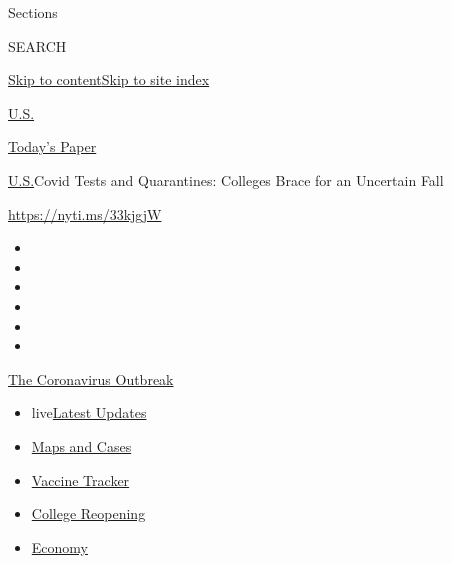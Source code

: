 Sections

SEARCH

\protect\hyperlink{site-content}{Skip to
content}\protect\hyperlink{site-index}{Skip to site index}

\href{https://www.nytimes.com/section/us}{U.S.}

\href{https://myaccount.nytimes.com/auth/login?response_type=cookie\&client_id=vi}{}

\href{https://www.nytimes.com/section/todayspaper}{Today's Paper}

\href{/section/us}{U.S.}\textbar{}Covid Tests and Quarantines: Colleges
Brace for an Uncertain Fall

\url{https://nyti.ms/33kjgjW}

\begin{itemize}
\item
\item
\item
\item
\item
\item
\end{itemize}

\href{https://www.nytimes.com/news-event/coronavirus?action=click\&pgtype=Article\&state=default\&region=TOP_BANNER\&context=storylines_menu}{The
Coronavirus Outbreak}

\begin{itemize}
\tightlist
\item
  live\href{https://www.nytimes.com/2020/08/03/world/coronavirus-covid-19.html?action=click\&pgtype=Article\&state=default\&region=TOP_BANNER\&context=storylines_menu}{Latest
  Updates}
\item
  \href{https://www.nytimes.com/interactive/2020/us/coronavirus-us-cases.html?action=click\&pgtype=Article\&state=default\&region=TOP_BANNER\&context=storylines_menu}{Maps
  and Cases}
\item
  \href{https://www.nytimes.com/interactive/2020/science/coronavirus-vaccine-tracker.html?action=click\&pgtype=Article\&state=default\&region=TOP_BANNER\&context=storylines_menu}{Vaccine
  Tracker}
\item
  \href{https://www.nytimes.com/2020/08/02/us/covid-college-reopening.html?action=click\&pgtype=Article\&state=default\&region=TOP_BANNER\&context=storylines_menu}{College
  Reopening}
\item
  \href{https://www.nytimes.com/live/2020/08/03/business/stock-market-today-coronavirus?action=click\&pgtype=Article\&state=default\&region=TOP_BANNER\&context=storylines_menu}{Economy}
\end{itemize}

